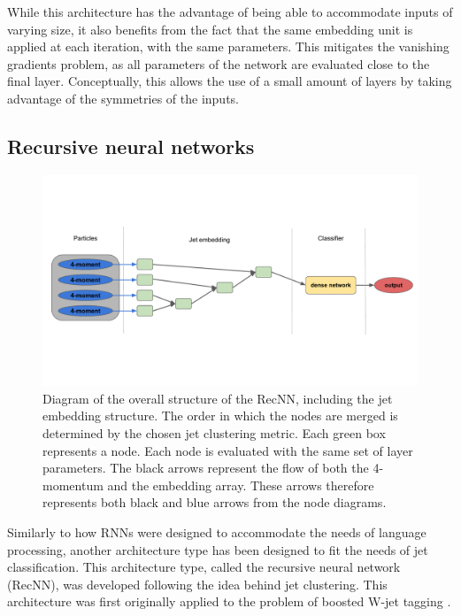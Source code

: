 While this architecture has the advantage of being able to accommodate inputs of varying size, it also benefits from the fact that the same embedding unit is applied at each iteration, with the same parameters. This mitigates the vanishing gradients problem, as all parameters of the network are evaluated close to the final layer. Conceptually, this allows the use of a small amount of layers by taking advantage of the symmetries of the inputs. 

\subsection{Recursive neural networks}
\label{sec:RecNN}


\begin{figure}
    \centering
    \includegraphics[width=\textwidth]{Images/RecNN_diagram.pdf}
    \caption{Diagram of the overall structure of the RecNN, including the jet embedding structure. The order in which the nodes are merged is determined by the chosen jet clustering metric. Each green box represents a node. Each node is evaluated with the same set of layer parameters. The black arrows represent the flow of both the 4-momentum and the embedding array. These arrows therefore represents both black and blue arrows from the node diagrams.}
    \label{fig:recursive_network}
\end{figure}

Similarly to how RNNs were designed to accommodate the needs of language processing, another architecture type has been designed to fit the needs of jet classification. This architecture type, called the recursive neural network (RecNN), was developed following the idea behind jet clustering. This architecture was first originally applied to the problem of boosted W-jet tagging \cite{Louppe:2017ipp}.

